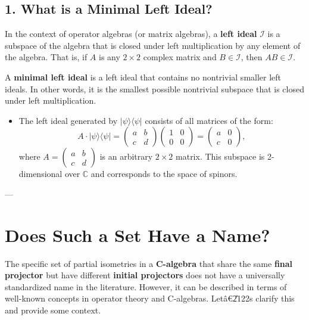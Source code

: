 \documentclass{article}
\begin{document}
\subsection*{1. What is a Minimal Left Ideal?}

In the context of operator algebras (or matrix algebras), a \textbf{left
ideal} $\mathcal{I} $ is a subspace of the algebra that is closed under left
multiplication by any element of the algebra. That is, if $A $ is any $2
\times 2 $ complex matrix and $B \in \mathcal{I} $, then $AB \in \mathcal{I} 
$.

A \textbf{minimal left ideal} is a left ideal that contains no nontrivial
smaller left ideals. In other words, it is the smallest possible nontrivial
subspace that is closed under left multiplication.

\begin{itemize}
\item The left ideal generated by $|\psi \rangle \langle \psi |$ consists of
all matrices of the form: 
\begin{equation*}
A\cdot |\psi \rangle \langle \psi |=%
\begin{pmatrix}
a & b \\ 
c & d%
\end{pmatrix}%
\begin{pmatrix}
1 & 0 \\ 
0 & 0%
\end{pmatrix}%
=%
\begin{pmatrix}
a & 0 \\ 
c & 0%
\end{pmatrix}%
,
\end{equation*}%
where $A=%
\begin{pmatrix}
a & b \\ 
c & d%
\end{pmatrix}%
$ is an arbitrary $2\times 2$ matrix. This subspace is 2-dimensional over $%
\mathbb{C}$ and corresponds to the space of spinors.
\end{itemize}

---

\section*{Does Such a Set Have a Name?}

The specific set of partial isometries in a \textbf{C\*-algebra} that share
the same \textbf{final projector} but have different \textbf{initial
projectors} does not have a universally standardized name in the literature.
However, it can be described in terms of well-known concepts in operator
theory and C\*-algebras. Let\^{a}\euro \U{2122}s clarify this and provide
some context.
\end{document}
